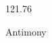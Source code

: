 \documentclass[12pt]{article}
\begin{document}
\hfill{}
\vfill
\begin{center}
  {\fontsize{50}{60}
  }

  121.76

Antimony
\end{center}
\vfill
\end{document}
